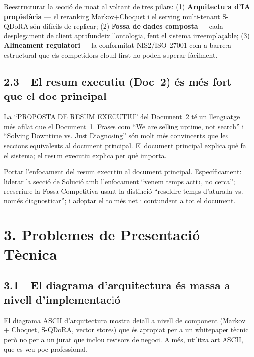 \documentclass[11pt,a4paper]{article}
\begin{document}
\begin{fixbox}
Reestructurar la secció de moat al voltant de tres pilars: (1) \textbf{Arquitectura d'IA propietària} --- el reranking Markov+Choquet i el serving multi-tenant S-QDoRA són difícils de replicar; (2) \textbf{Fossa de dades composta} --- cada desplegament de client aprofundeix l'ontologia, fent el sistema irreemplaçable; (3) \textbf{Alineament regulatori} --- la conformitat NIS2/ISO~27001 com a barrera estructural que els competidors cloud-first no poden superar fàcilment.
\end{fixbox}

\subsection{2.3~~El resum executiu (Doc~2) és més fort que el doc principal}

\begin{issuebox}
La ``PROPOSTA DE RESUM EXECUTIU'' del Document~2 té un llenguatge més afilat que el Document~1. Frases com ``We are selling uptime, not search'' i ``Solving Downtime vs. Just Diagnosing'' són molt més convincents que les seccions equivalents al document principal. El document principal explica què fa el sistema; el resum executiu explica per què importa.
\end{issuebox}

\begin{fixbox}
Portar l'enfocament del resum executiu al document principal. Específicament: liderar la secció de Solució amb l'enfocament ``venem temps actiu, no cerca''; reescriure la Fossa Competitiva usant la distinció ``resoldre temps d'aturada vs. només diagnosticar''; i adoptar el to més net i contundent a tot el document.
\end{fixbox}

\section{3. Problemes de Presentació Tècnica}

\subsection{3.1~~El diagrama d'arquitectura és massa a nivell d'implementació}

\begin{issuebox}
El diagrama ASCII d'arquitectura mostra detall a nivell de component (Markov + Choquet, S-QDoRA, vector stores) que és apropiat per a un whitepaper tècnic però no per a un jurat que inclou revisors de negoci. A més, utilitza art ASCII, que es veu poc professional.
\end{issuebox}
\end{document}
